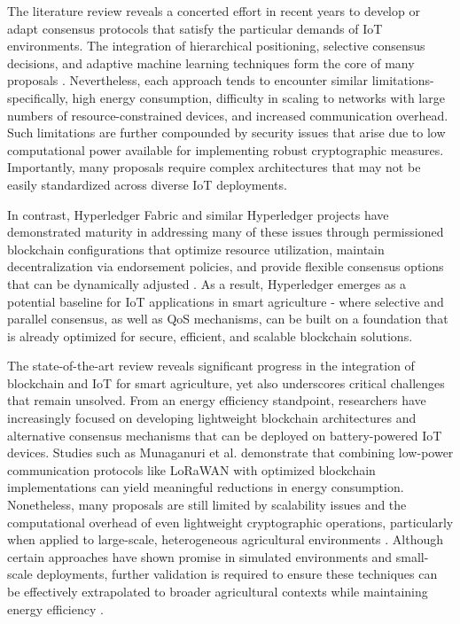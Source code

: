 \documentclass[12pt,onecolumn]{IEEEtran} %
\begin{document}
The literature review reveals a concerted effort in recent years to develop or adapt consensus protocols that satisfy the particular demands of IoT environments. The integration of hierarchical positioning, selective consensus decisions, and adaptive machine learning techniques form the core of many proposals \cite{ali2022blockchainenabledarchitecture, guru2023asurveyon, guo2022ahierarchicaland}. Nevertheless, each approach tends to encounter similar limitations-specifically, high energy consumption, difficulty in scaling to networks with large numbers of resource-constrained devices, and increased communication overhead. Such limitations are further compounded by security issues that arise due to low computational power available for implementing robust cryptographic measures. Importantly, many proposals require complex architectures that may not be easily standardized across diverse IoT deployments.

In contrast, Hyperledger Fabric and similar Hyperledger projects have demonstrated maturity in addressing many of these issues through permissioned blockchain configurations that optimize resource utilization, maintain decentralization via endorsement policies, and provide flexible consensus options that can be dynamically adjusted \cite{bryant2022keychallengesin, khan2022asurveyand}. As a result, Hyperledger emerges as a potential baseline for IoT applications in smart agriculture - where selective and parallel consensus, as well as QoS mechanisms, can be built on a foundation that is already optimized for secure, efficient, and scalable blockchain solutions.

The state-of-the-art review reveals significant progress in the integration of blockchain and IoT for smart agriculture, yet also underscores critical challenges that remain unsolved. From an energy efficiency standpoint, researchers have increasingly focused on developing lightweight blockchain architectures and alternative consensus mechanisms that can be deployed on battery-powered IoT devices. Studies such as Munaganuri et al. \cite{munaganuri2025designofan} demonstrate that combining low-power communication protocols like LoRaWAN with optimized blockchain implementations can yield meaningful reductions in energy consumption. Nonetheless, many proposals are still limited by scalability issues and the computational overhead of even lightweight cryptographic operations, particularly when applied to large-scale, heterogeneous agricultural environments \cite{akella2023asystematicreview, munaganuri2025designofan}. Although certain approaches have shown promise in simulated environments and small-scale deployments, further validation is required to ensure these techniques can be effectively extrapolated to broader agricultural contexts while maintaining energy efficiency \cite{tahayur2024enhancingelectronicagriculture, mwewa2024blockchaintechnologya}.
\end{document}
